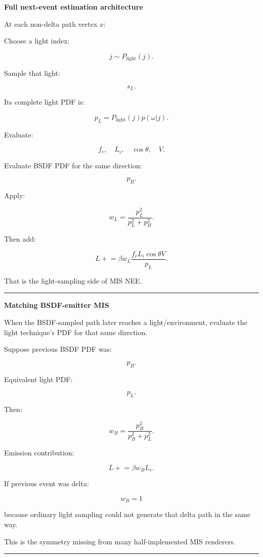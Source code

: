 \textbf{Full next-event estimation architecture}

At each non-delta path vertex \(x\):

Choose a light index:

\[
j\sim P_{\text{light}}(j).
\]

Sample that light:

\[
s_L.
\]

Its complete light PDF is:

\[
\boxed{
p_L
=
P_{\text{light}}(j)
p(\omega|j).
}
\]

Evaluate:

\[
f_r,
\quad
L_i,
\quad
\cos\theta,
\quad
V.
\]

Evaluate BSDF PDF for the same direction:

\[
p_B.
\]

Apply:

\[
w_L=
\frac{p_L^2}{p_L^2+p_B^2}.
\]

Then add:

\[
\boxed{
L
\mathrel{+}=
\beta
w_L
\frac{
f_rL_i\cos\theta V
}{
p_L
}.
}
\]

That is the light-sampling side of MIS NEE.

\begin{center}\rule{0.5\linewidth}{0.5pt}\end{center}

\textbf{Matching BSDF-emitter MIS}

When the BSDF-sampled path later reaches a light/environment, evaluate the light technique's PDF for that same direction.

Suppose previous BSDF PDF was:

\[
p_B.
\]

Equivalent light PDF:

\[
p_L.
\]

Then:

\[
w_B
=
\frac{
p_B^2
}{
p_B^2+p_L^2
}.
\]

Emission contribution:

\[
\boxed{
L
\mathrel{+}=
\beta
w_B
L_e.
}
\]

If previous event was delta:

\[
w_B=1
\]

because ordinary light sampling could not generate that delta path in the same way.

This is the symmetry missing from many half-implemented MIS renderers.

\begin{center}\rule{0.5\linewidth}{0.5pt}\end{center}

